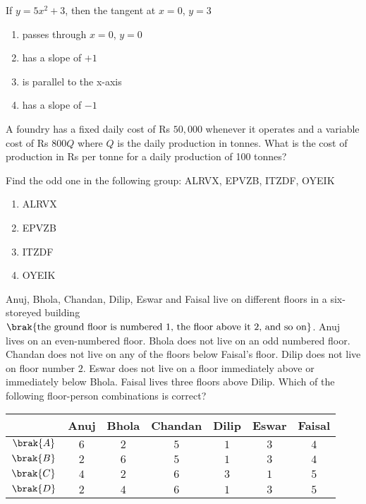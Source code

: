 \item If $y = 5x^2 + 3$, then the tangent at $x = 0$, $y = 3$
\hfill{}
\begin{enumerate}
\item passes through $x=0$, $y=0$
\item has a slope of $+1$
\item is parallel to the x-axis
\item has a slope of $-1$
\end{enumerate}

\item A foundry has a fixed daily cost of Rs $50,000$ whenever it operates and a variable cost of Rs $800Q$ where $Q$ is the daily production in tonnes. What is the cost of production in Rs per tonne for a daily production of 100 tonnes?
\hfill{}

\item Find the odd one in the following group: ALRVX, EPVZB, ITZDF, OYEIK
\hfill{}
\begin{enumerate}
\item ALRVX
\item EPVZB
\item ITZDF
\item OYEIK
\end{enumerate}

\item Anuj, Bhola, Chandan, Dilip, Eswar and Faisal live on different floors in a six-storeyed building$\brak{\text{the ground floor is numbered 1, the floor above it 2, and so on}}$. Anuj lives on an even-numbered floor. Bhola does not live on an odd numbered floor. Chandan does not live on any of the floors below Faisal's floor. Dilip does not live on floor number $2$. Eswar does not live on a floor immediately above or immediately below Bhola. Faisal lives three floors above Dilip. Which of the following floor-person combinations is correct?\\
\hfill{}
\begin{center}
\begin{tabular}[12pt]{ |c|c|c|c|c|c|c|}
\hline
 &Anuj & Bhola & Chandan & Dilip & Eswar & Faisal\\ 
\hline
$\brak{A}$ & $6$ & $2$ & $5$ & $1$ & $3$ & $4$\\
\hline
$\brak{B}$ & $2$ & $6$ & $5$ & $1$ & $3$ & $4$\\
\hline
$\brak{C}$ & $4$ & $2$ & $6$ & $3$ & $1$ & $5$\\
\hline
$\brak{D}$ & $2$ & $4$ & $6$ & $1$ & $3$ & $5$\\
\hline
\end{tabular}\\
\end{center}


